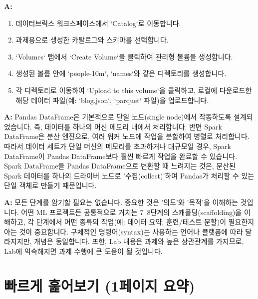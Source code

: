 \documentclass[11pt,a4paper]{article}
\begin{document}
\begin{tcolorbox}[mybox, title=Q: 데이터브릭스 볼륨에 데이터를 업로드하는 구체적인 절차는 무엇인가요?]
\textbf{A:}
\begin{enumerate}
    \item 데이터브릭스 워크스페이스에서 `Catalog`로 이동합니다.
    \item 과제용으로 생성한 카탈로그와 스키마를 선택합니다.
    \item `Volumes` 탭에서 `Create Volume`을 클릭하여 관리형 볼륨을 생성합니다.
    \item 생성된 볼륨 안에 `people-10m`, `names`와 같은 디렉토리를 생성합니다.
    \item 각 디렉토리로 이동하여 `Upload to this volume`을 클릭하고, 로컬에 다운로드한 해당 데이터 파일(예: `blog.json`, `parquet` 파일)을 업로드합니다.
\end{enumerate}
\end{tcolorbox}

\begin{tcolorbox}[mybox, title=Q: Pandas DataFrame이 Spark DataFrame보다 느린 이유는 무엇인가요?]
\textbf{A:} Pandas DataFrame은 기본적으로 단일 노드(single node)에서 작동하도록 설계되었습니다. 즉, 데이터를 하나의 머신 메모리 내에서 처리합니다. 반면 Spark DataFrame은 분산 엔진으로, 여러 워커 노드에 작업을 분할하여 병렬로 처리합니다. 따라서 데이터 세트가 단일 머신의 메모리를 초과하거나 대규모일 경우, Spark DataFrame이 Pandas DataFrame보다 훨씬 빠르게 작업을 완료할 수 있습니다. Spark DataFrame을 Pandas DataFrame으로 변환할 때 느려지는 것은, 분산된 Spark 데이터를 하나의 드라이버 노드로 '수집(collect)'하여 Pandas가 처리할 수 있는 단일 객체로 만들기 때문입니다.
\end{tcolorbox}

\begin{tcolorbox}[mybox, title=Q: Lab 노트북을 어떻게 공부해야 하나요? 모든 단계를 암기해야 하나요?]
\textbf{A:} 모든 단계를 암기할 필요는 없습니다. 중요한 것은 '의도'와 '목적'을 이해하는 것입니다. 어떤 ML 프로젝트든 공통적으로 거치는 7~8단계의 스캐폴딩(scaffolding)을 이해하고, 각 단계에서 어떤 종류의 작업(예: 데이터 요약, 훈련/테스트 분할)이 필요한지 아는 것이 중요합니다. 구체적인 명령어(syntax)는 사용하는 언어나 플랫폼에 따라 달라지지만, 개념은 동일합니다. 또한, Lab 내용은 과제와 높은 상관관계를 가지므로, Lab에 익숙해지면 과제 수행에 큰 도움이 될 것입니다.
\end{tcolorbox}

\newpage
\section{빠르게 훑어보기 (1페이지 요약)}
\end{document}
